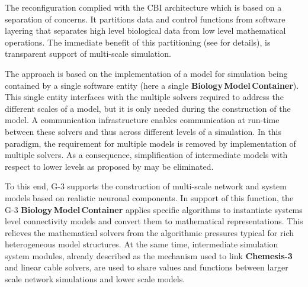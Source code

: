 \documentclass{article}
\begin{document}
The reconfiguration complied with the CBI architecture which is based on a separation of concerns. It partitions data and control functions from software layering that separates high level biological data from low level mathematical operations. The immediate benefit of this partitioning (see \cite{10.1371/journal.pone.0028956} for details), is transparent support of multi-scale simulation.

The approach is based on the implementation of a model for simulation being contained by a single software entity (here a single {\bf Biology\,Model\,Container}). This single entity interfaces with the multiple solvers required to address the different scales of a model, but it is only needed during the construction of the model. A communication infrastructure enables communication at run-time between these solvers and thus across different levels of a simulation. In this paradigm, the requirement for multiple models is removed by implementation of multiple solvers. As a consequence, simplification of intermediate models with respect to lower levels as proposed by \cite{Sejnowski:1988fk} may be eliminated. 




To this end, G-3 supports the construction of multi-scale network and system
models based on realistic neuronal components.  In support of
this function, the G-3 {\bf Biology\,Model\,Container} applies specific algorithms to
instantiate systems level connectivity models and convert them to
mathematical representations. This relieves the mathematical solvers from
the algorithmic pressures typical for rich heterogeneous model structures.  At the
same time, intermediate simulation system modules, already
described as the mechanism used to link {\bf Chemesis-3} and linear
cable solvers, are used to share values and functions between
larger scale network simulations and lower scale models.
\end{document}
